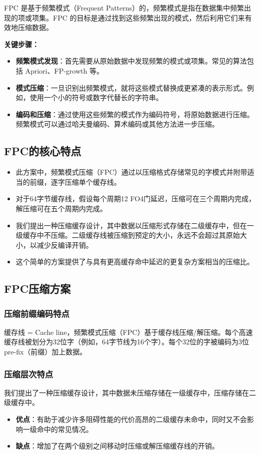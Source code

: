 \documentclass[12pt]{article}
\begin{document}
FPC 是基于频繁模式（Frequent Patterns）的，频繁模式是指在数据集中频繁出现的项或项集。FPC 的目标是通过找到这些频繁出现的模式，然后利用它们来有效地压缩数据。

\textbf{关键步骤：}
\begin{itemize}
  \item \textbf{频繁模式发现}：首先需要从原始数据中发现频繁的模式或项集。常见的算法包括 Apriori、FP-growth 等。
  \item \textbf{模式压缩}：一旦识别出频繁模式，就将这些模式替换成更紧凑的表示形式。例如，使用一个小的符号或数字代替长的字符串。
  \item \textbf{编码和压缩}：通过使用这些频繁的模式作为编码符号，将原始数据进行压缩。频繁模式可以通过哈夫曼编码、算术编码或其他方法进一步压缩。
\end{itemize}

\subsection{FPC的核心特点}

\begin{itemize}
  \item 此方案中，频繁模式压缩（FPC）通过以压缩格式存储常见的字模式并附带适当的前缀，逐字压缩单个缓存线。
  \item 对于64字节缓存线，假设每个周期12 FO4门延迟，压缩可在三个周期内完成，解压缩可在五个周期内完成。
  \item 我们提出一种压缩缓存设计，其中数据以压缩形式存储在二级缓存中，但在一级缓存中不压缩。二级缓存线被压缩到预定的大小，永远不会超过其原始大小，以减少反编译开销。
  \item 这个简单的方案提供了与具有更高缓存命中延迟的更复杂方案相当的压缩比。
\end{itemize}

\subsection{FPC压缩方案}

\subsubsection{压缩前缀编码特点}
缓存线 = Cache line，频繁模式压缩（FPC）基于缓存线压缩/解压缩。每个高速缓存线被划分为32位字（例如，64字节线为16个字）。每个32位的字被编码为3位pre-fix（前缀）加上数据。

\subsubsection{压缩层次特点}
我们提出了一种压缩缓存设计，其中数据未压缩存储在一级缓存中，压缩存储在二级缓存中。
\begin{itemize}
  \item \textbf{优点}：有助于减少许多阻碍性能的代价高昂的二级缓存未命中，同时又不会影响一级命中的常见情况。
  \item \textbf{缺点}：增加了在两个级别之间移动时压缩或解压缩缓存线的开销。
\end{itemize}
\end{document}
